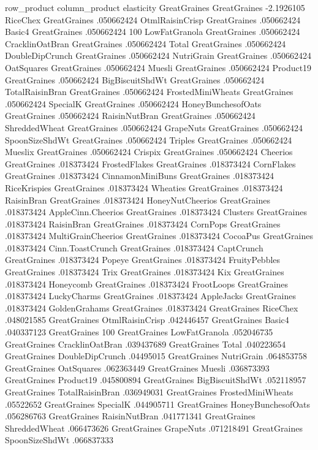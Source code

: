 row_product	column_product	elasticity
GreatGraines	GreatGraines	-2.1926105
RiceChex	GreatGraines	.050662424
OtmlRaisinCrisp	GreatGraines	.050662424
Basic4	GreatGraines	.050662424
100%
LowFatGranola	GreatGraines	.050662424
CracklinOatBran	GreatGraines	.050662424
Total	GreatGraines	.050662424
DoubleDipCrunch	GreatGraines	.050662424
NutriGrain	GreatGraines	.050662424
OatSquares	GreatGraines	.050662424
Muesli	GreatGraines	.050662424
Product19	GreatGraines	.050662424
BigBiscuitShdWt	GreatGraines	.050662424
TotalRaisinBran	GreatGraines	.050662424
FrostedMiniWheats	GreatGraines	.050662424
SpecialK	GreatGraines	.050662424
HoneyBunchesofOats	GreatGraines	.050662424
RaisinNutBran	GreatGraines	.050662424
ShreddedWheat	GreatGraines	.050662424
GrapeNuts	GreatGraines	.050662424
SpoonSizeShdWt	GreatGraines	.050662424
Triples	GreatGraines	.050662424
Mueslix	GreatGraines	.050662424
Crispix	GreatGraines	.050662424
Cheerios	GreatGraines	.018373424
FrostedFlakes	GreatGraines	.018373424
CornFlakes	GreatGraines	.018373424
CinnamonMiniBuns	GreatGraines	.018373424
RiceKrispies	GreatGraines	.018373424
Wheaties	GreatGraines	.018373424
RaisinBran	GreatGraines	.018373424
HoneyNutCheerios	GreatGraines	.018373424
AppleCinn.Cheerios	GreatGraines	.018373424
Clusters	GreatGraines	.018373424
RaisinBran	GreatGraines	.018373424
CornPops	GreatGraines	.018373424
MultiGrainCheerios	GreatGraines	.018373424
CocoaPus	GreatGraines	.018373424
Cinn.ToastCrunch	GreatGraines	.018373424
CaptCrunch	GreatGraines	.018373424
Popeye	GreatGraines	.018373424
FruityPebbles	GreatGraines	.018373424
Trix	GreatGraines	.018373424
Kix	GreatGraines	.018373424
Honeycomb	GreatGraines	.018373424
FrootLoops	GreatGraines	.018373424
LuckyCharms	GreatGraines	.018373424
AppleJacks	GreatGraines	.018373424
GoldenGrahams	GreatGraines	.018373424
GreatGraines	RiceChex	.048021585
GreatGraines	OtmlRaisinCrisp	.042446457
GreatGraines	Basic4	.040337123
GreatGraines	100%
GreatGraines	LowFatGranola	.052046735
GreatGraines	CracklinOatBran	.039437689
GreatGraines	Total	.040223654
GreatGraines	DoubleDipCrunch	.04495015
GreatGraines	NutriGrain	.064853758
GreatGraines	OatSquares	.062363449
GreatGraines	Muesli	.036873393
GreatGraines	Product19	.045800894
GreatGraines	BigBiscuitShdWt	.052118957
GreatGraines	TotalRaisinBran	.036949031
GreatGraines	FrostedMiniWheats	.05522652
GreatGraines	SpecialK	.044905711
GreatGraines	HoneyBunchesofOats	.056286763
GreatGraines	RaisinNutBran	.041771341
GreatGraines	ShreddedWheat	.066473626
GreatGraines	GrapeNuts	.071218491
GreatGraines	SpoonSizeShdWt	.066837333
